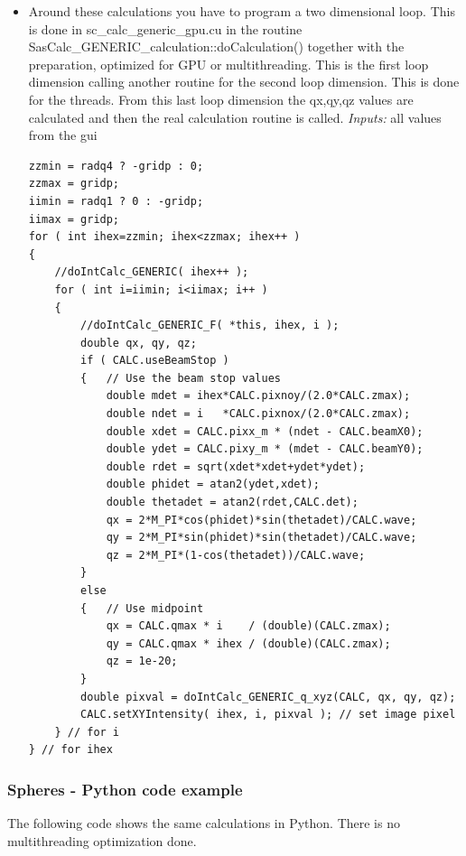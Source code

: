 \documentclass[11pt]{article} %
\begin{document}
\begin{itemize}
\item Around these calculations you have to program a two dimensional loop. This is done in sc\_calc\_generic\_gpu.cu in the routine SasCalc\_GENERIC\_calculation::doCalculation() together with the preparation, optimized for GPU or multithreading. This is the first loop dimension calling another routine for the second loop dimension. This is done for the threads. From this last loop dimension the qx,qy,qz values are calculated and then the real calculation routine is called.
{\it Inputs:} all values from the gui
\begin{lstlisting}[frame=single]
zzmin = radq4 ? -gridp : 0;
zzmax = gridp;
iimin = radq1 ? 0 : -gridp;
iimax = gridp;
for ( int ihex=zzmin; ihex<zzmax; ihex++ )
{
    //doIntCalc_GENERIC( ihex++ );
    for ( int i=iimin; i<iimax; i++ )
    {
        //doIntCalc_GENERIC_F( *this, ihex, i );
        double qx, qy, qz;
        if ( CALC.useBeamStop )
        {   // Use the beam stop values
            double mdet = ihex*CALC.pixnoy/(2.0*CALC.zmax);
            double ndet = i   *CALC.pixnox/(2.0*CALC.zmax);
            double xdet = CALC.pixx_m * (ndet - CALC.beamX0);
            double ydet = CALC.pixy_m * (mdet - CALC.beamY0);
            double rdet = sqrt(xdet*xdet+ydet*ydet);
            double phidet = atan2(ydet,xdet);
            double thetadet = atan2(rdet,CALC.det);
            qx = 2*M_PI*cos(phidet)*sin(thetadet)/CALC.wave;
            qy = 2*M_PI*sin(phidet)*sin(thetadet)/CALC.wave;
            qz = 2*M_PI*(1-cos(thetadet))/CALC.wave;
        }
        else
        {   // Use midpoint
            qx = CALC.qmax * i    / (double)(CALC.zmax);
            qy = CALC.qmax * ihex / (double)(CALC.zmax);
            qz = 1e-20;
        }
        double pixval = doIntCalc_GENERIC_q_xyz(CALC, qx, qy, qz);
        CALC.setXYIntensity( ihex, i, pixval ); // set image pixel
    } // for i
} // for ihex
\end{lstlisting}

\end{itemize}

\subsubsection{Spheres - Python code example}

The following code shows the same calculations in Python. There is no multithreading optimization done.
\end{document}
